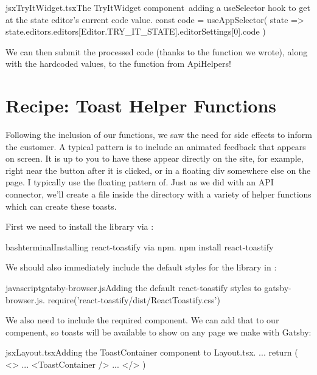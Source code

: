 \documentclass[paper=6in:9in,pagesize=pdftex,headinclude=on,footinclude=on,12pt,twoside]{scrbook}
\begin{document}
\begin{codeInput}{jsx}{TryItWidget.tsx}{The TryItWidget component\, adding a useSelector hook to get at the state editor's current code value.}
const code = useAppSelector(
  state => state.editors.editors[Editor.TRY_IT_STATE].editorSettings[0].code
)
\end{codeInput}

We can then submit the processed code (thanks to the  function we wrote), along with the hardcoded values, to the  function from ApiHelpers!

\section{Recipe: Toast Helper Functions}

Following the inclusion of our  functions, we saw the need for side effects to inform the customer. A typical pattern is to include an animated feedback that appears on screen. It is up to you to have these appear directly on the site, for example, right near the button after it is clicked, or in a floating div somewhere else on the page. I typically use the floating pattern of. Just as we did with an API connector, we'll create a file  inside the  directory with a variety of helper functions which can create these toasts.


First we need to install the  library via :

\begin{codeInput}{bash}{terminal}{Installing react-toastify via npm.}
npm install react-toastify
\end{codeInput}

We should also immediately include the default styles for the library in :

\begin{codeInput}{javascript}{gatsby-browser.js}{Adding the default react-toastify styles to gatsby-browser.js.}
require('react-toastify/dist/ReactToastify.css')
\end{codeInput}

We also need to include the required  component. We can add that to our  compenent, so toasts will be available to show on any page we make with Gatsby:

\begin{codeInput}{jsx}{Layout.tsx}{Adding the ToastContainer component to Layout.tsx.}
...
return (
  <>
    ...
    <ToastContainer />
    ...
  </>
)
\end{codeInput}
\end{document}
